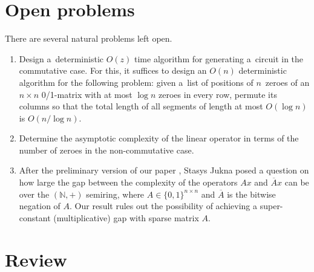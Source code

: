 \documentclass{toc}
\begin{document}
\section{Open problems}
There are several natural problems left open.
\begin{enumerate}
\item Design a~deterministic $O(z)$ time algorithm for generating
a~circuit in the commutative case.
For this, it suffices to design an $O(n)$ deterministic algorithm for the
following problem: given a~list of positions of $n$~zeroes of an $n \times n$
0/1-matrix with at most $\log n$ zeroes in every row, permute its columns so
that the total length of all segments of length at most $O(\log n)$ is
$O(n/\log n)$.
\item Determine the asymptotic complexity of the linear operator in terms of the number of zeroes in the non-commutative case.
\item After the preliminary version of our paper
\cite{conf-version}, %
Stasys Jukna posed a question on how large %
the gap between the complexity of the operators $Ax$ and $\overline{A}x$ can be over
the  %
$(\mathbb{N},+)$ semiring, where $A \in \{0,1\}^{n\times n}$ and $\overline{A}$ is
the bitwise %
negation of $A$. Our result rules out the possibility of achieving
a  %
super-constant (multiplicative) gap with sparse matrix $A$.

\end{enumerate}



\appendix
\section{Review}
\end{document}
